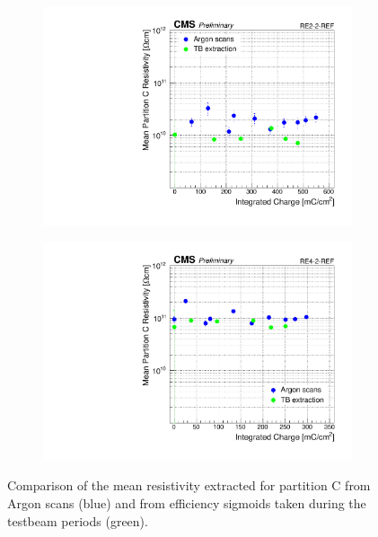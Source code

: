 \begin{figure}[H]
\begin{subfigure}{0.5\linewidth}
    		\includegraphics[width = \linewidth]{fig/chapt5/Extract-Res_vs_time_RE2-2-REF.pdf}
        	\caption{\label{fig:Resistivity-extract:C}}
    	\end{subfigure}
    	\begin{subfigure}{0.5\linewidth}
			\centering
    		\includegraphics[width = \linewidth]{fig/chapt5/Extract-Res_vs_time_RE4-2-REF.pdf}
        	\caption{\label{fig:Resistivity-extract:D}}
    	\end{subfigure}
		\caption{\label{fig:Resistivity-extract} Comparison of the mean resistivity extracted for partition C from Argon scans (blue) and from efficiency sigmoids taken during the testbeam periods (green).}
	\end{figure}
	
